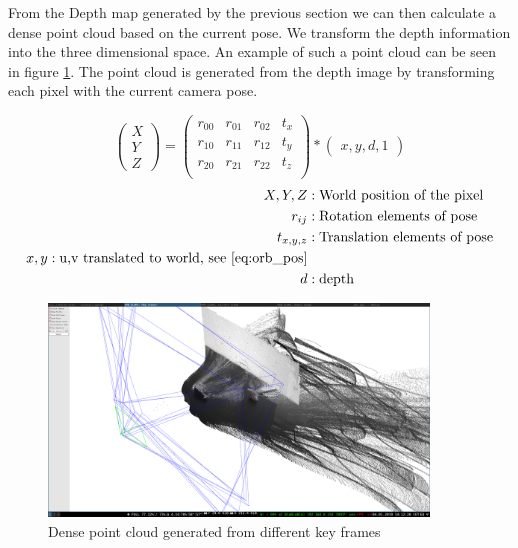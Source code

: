 \documentclass[11pt,a4paper,titlepage,oneside]{report}
\begin{document}
From the Depth map generated by the previous section we can then calculate a dense point cloud based on the current pose. We transform the depth information into the three dimensional space. An example of such a point cloud can be seen in figure \ref{fig:pointcloud}. The point cloud is generated from the depth image by transforming each pixel with the current camera pose.

\begin{equation}\label{eq:point_cloud_depth}
	\begin{pmatrix}
			X \\
			Y \\
			Z
	\end{pmatrix}=
	\begin{pmatrix}
		r_{00} & r_{01} & r_{02} & t_x \\
		r_{10} & r_{11} & r_{12} & t_y \\
		r_{20} & r_{21} & r_{22} & t_z \\
	\end{pmatrix}*
	\begin{pmatrix}
		x,
		y,
		d,
		1
	\end{pmatrix}
\end{equation}
\begin{align*}
	X,Y,Z &:			\text{World position of the pixel}\\
	r_{ij} &:			\text{Rotation elements of pose}\\
	t_{x,y,z} &:	\text{Translation elements of pose}\\
	x,y:					\text{u,v translated to world, see \ref{eq:orb_pos}}\\
	d &:					\text{depth}
\end{align*}

\begin{figure}[H]
  \begin{center}
		\includegraphics[width=0.9\textwidth]{img/pointcloud.png}
  \end{center}
	\caption{Dense point cloud generated from different key frames}\label{fig:pointcloud}
\end{figure}
\end{document}
